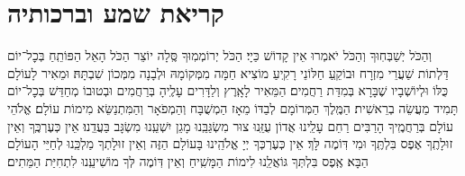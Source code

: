 
\label{nishmas}
\nishmat

\hael

\shochenad

\yishtabach
{}
\halfkaddish

\section[קריאת שמע וברכותיה]{ קריאת שמע וברכותיה }

\barachu



וְהַכֹּל יְשַׁבְּחֽוּךָ \middot וְהַכֹּל יֹאמְרוּ אֵין קָדוֹשׁ כַּיָי׃ הַכֹּל יְרוֹמְמֽוּךָ סֶּֽלָה יוֹצֵר הַכֹּל \middot הָאֵל הַפּוֹתֵֽחַ בְּכׇל־יוֹם דַּלְתוֹת שַׁעֲרֵי מִזְרָח \middot וּבוֹקֵֽעַ חַלּוֹנֵי רָקִֽיעַ מוֹצִיא חַמָּה מִמְּקוֹמָהּ וּלְבָנָה מִמְּכוֹן שִׁבְתָּהּ׃ וּמֵאִיר לָעוֹלָם כֻּלּוֹ וּלְיוֹשְׁבָיו שֶׁבָּרָא בְּמִדַּת רַחֲמִים׃ 
הַמֵּאִיר לָאָֽרֶץ וְלַדָּרִים עָלֶֽיהָ בְּרַחֲמִים \middot וּבְטוּבוֹ מְחַדֵּשׁ בְּכׇל־יוֹם תָּמִיד מַעֲשֵׂה בְרֵאשִׁית׃
הַמֶּֽלֶךְ הַמְּרוֹמָם לְבַדּוֹ מֵאָז \middot הַמְשֻׁבָּח וְהַמְפֹאָר וְהַמִּתְנַשֵּׂא מִימוֹת עוֹלָם׃
אֱלֹהֵי עוֹלָם בְּרַחֲמֶֽיךָ הָרַבִּים רַחֵם עָלֵֽינוּ \middot אֲדוֹן עֻזֵּֽנוּ צוּר מִשְׂגַּבֵּֽנוּ מָגֵן יִשְׁעֵֽנוּ מִשְׂגָּב בַּעֲדֵֽנוּ׃
אֵין כְּעֶרְכֶּֽךָ וְאֵין זוּלָתֶֽךָ \middot אֶפֶס בִּלְתֶּֽךָ וּמִי דּֽוֹמֶה לָּךְ׃
אֵין כְּעֶרְכְּךָ יְיָ אֱלֹהֵֽינוּ בָּעוֹלָם הַזֶּה \middot וְאֵין זוּלָתְךָ מַלְכֵּֽנוּ לְחַיֵּי הָעוֹלָם הַבָּא׃
אֶֽפֶס בִּלְתְּךָ גּוֹאֲלֵֽנוּ לִימוֹת הַמָּשִֽׁיחַ \middot וְאֵין דּֽוֹמֶה לְּךָ מוֹשִׁיעֵֽנוּ לִתְחִיַּת הַמֵּתִים׃

